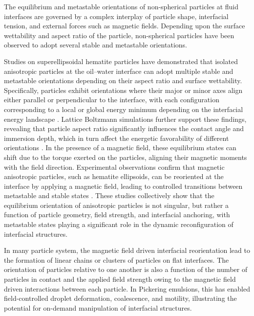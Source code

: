 The equilibrium and metastable orientations of non-spherical particles at fluid interfaces are governed by a complex interplay of particle shape, 
interfacial tension, and external forces such as magnetic fields. Depending upon the surface wettability and aspect ratio of the particle, non-spherical
particles have been observed to adopt several stable and metastable orientations. \cite{morgan_understanding_2013, newton_influence_2014}

Studies on superellipsoidal hematite particles have demonstrated that isolated 
anisotropic particles at the oil–water interface can adopt multiple stable and metastable orientations depending on their aspect ratio and surface 
wettability. Specifically, particles exhibit orientations where their major or minor axes align either parallel or perpendicular to the interface, 
with each configuration corresponding to a local or global energy minimum depending on the interfacial energy landscape \cite{1}. Lattice Boltzmann 
simulations further support these findings, revealing that particle aspect ratio significantly influences the contact angle and immersion depth, 
which in turn affect the energetic favorability of different orientations \cite{3}. In the presence of a magnetic field, these equilibrium states can 
shift due to the torque exerted on the particles, aligning their magnetic moments with the field direction. Experimental observations confirm that 
magnetic anisotropic particles, such as hematite ellipsoids, can be reoriented at the interface by applying a magnetic field, leading to controlled 
transitions between metastable and stable states \cite{2}. These studies collectively show that the equilibrium orientation of anisotropic particles 
is not singular, but rather a function of particle geometry, field strength, and interfacial anchoring, with metastable states playing a significant 
role in the dynamic reconfiguration of interfacial structures.

In many particle system, the magnetic field driven interfacial reorientation lead to the formation of linear chains or clusters of particles on flat interfaces. 
\cite{davies_assembling_2014, davies_interface_2014,newton_influence_2014, newton_capillary_2018} The orientation of particles relative to one another is also
a function of the number of particles in contact and the applied field strength owing to the magnetic field driven interactions between each particle. 
\cite{newton_influence_2014, newton_capillary_2018} In Pickering emulsions, this has enabled field-controlled droplet deformation, coalescence, 
and motility, illustrating the potential for on-demand manipulation of interfacial structures. \cite{melle_pickering_2005, tham_magnetophoresis_2021} 

